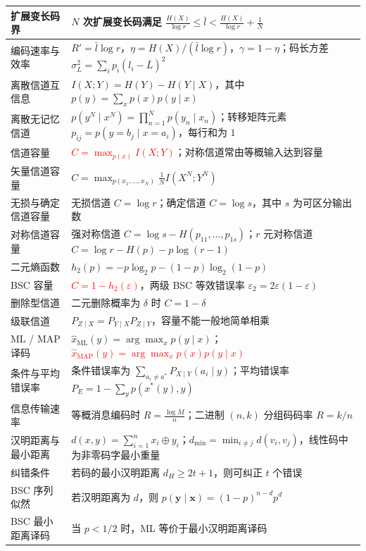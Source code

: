 {\begin{longtable}{@{}p{}p{}@{}}
\midrule
扩展变长码界 & $N$ 次扩展变长码满足 $\frac{H(X)}{\log r}\le\bar l<\frac{H(X)}{\log r}+\frac1N$ \\
\midrule
编码速率与效率 & $R'=\bar l\log r$，$\eta=H(X)/(\bar l\log r)$，$\gamma=1-\eta$；码长方差 $\sigma_L^2=\sum_ip_i(l_i-\bar L)^2$ \\
\midrule
离散信道互信息 & $I(X;Y)=H(Y)-H(Y\mid X)$，其中 $p(y)=\sum_xp(x)p(y\mid x)$ \\
\midrule
离散无记忆信道 & $p(y^N\mid x^N)=\prod_{n=1}^Np(y_n\mid x_n)$；转移矩阵元素 $p_{ij}=p(y=b_j\mid x=a_i)$，每行和为 $1$ \\
\midrule
信道容量 & \textcolor{Red}{$C=\max_{p(x)}I(X;Y)$}；对称信道常由等概输入达到容量 \\
\midrule
矢量信道容量 & $C=\max_{p(x_1,\dots,x_N)}\frac1N I(X^N;Y^N)$ \\
\midrule
无损与确定信道容量 & 无损信道 $C=\log r$；确定信道 $C=\log s$，其中 $s$ 为可区分输出数 \\
\midrule
对称信道容量 & 强对称信道 $C=\log s-H(p_{11},\dots,p_{1s})$；$r$ 元对称信道 $C=\log r-H(p)-p\log(r-1)$ \\
\midrule
二元熵函数 & $h_2(p)=-p\log_2p-(1-p)\log_2(1-p)$ \\
\midrule
BSC 容量 & \textcolor{Red}{$C=1-h_2(\varepsilon)$}，两级 BSC 等效错误率 $\varepsilon_2=2\varepsilon(1-\varepsilon)$ \\
\midrule
删除型信道 & 二元删除概率为 $\delta$ 时 $C=1-\delta$ \\
\midrule
级联信道 & $P_{Z\mid X}=P_{Y\mid X}P_{Z\mid Y}$，容量不能一般地简单相乘 \\
\midrule
ML / MAP 译码 & $\hat x_{\mathrm{ML}}(y)=\arg\max_xp(y\mid x)$；\textcolor{Red}{$\hat x_{\mathrm{MAP}}(y)=\arg\max_xp(x)p(y\mid x)$} \\
\midrule
条件与平均错误率 & 条件错误率为 $\sum_{a_i\ne a^*}P_{X\mid Y}(a_i\mid y)$；平均错误率 $P_E=1-\sum_y p(x^*(y),y)$ \\
\midrule
信息传输速率 & 等概消息编码时 $R=\frac{\log M}{n}$；二进制 $(n,k)$ 分组码码率 $R=k/n$ \\
\midrule
汉明距离与最小距离 & $d(x,y)=\sum_{i=1}^nx_i\oplus y_i$；$d_{\min}=\min_{i\ne j}d(v_i,v_j)$，线性码中为非零码字最小重量 \\
\midrule
纠错条件 & 若码的最小汉明距离 $d_H\ge2t+1$，则可纠正 $t$ 个错误 \\
\midrule
BSC 序列似然 & 若汉明距离为 $d$，则 $p(\mathbf y\mid\mathbf x)=(1-p)^{n-d}p^d$ \\
\midrule
BSC 最小距离译码 & 当 $p<1/2$ 时，ML 等价于最小汉明距离译码 \\

\end{longtable}}
